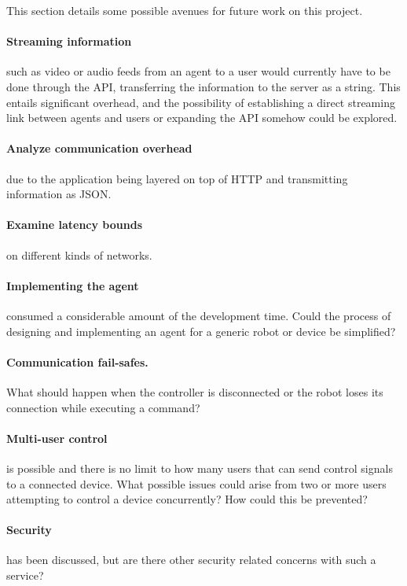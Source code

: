 This section details some possible avenues for future work on this project.

\paragraph{Streaming information} such as video or audio feeds from an agent to a user would currently have to be done through the API, transferring the information to the server as a string.
This entails significant overhead, and the possibility of establishing a direct streaming link between agents and users or expanding the API somehow could be explored.

\paragraph{Analyze communication overhead} due to the application being layered on top of HTTP and transmitting information as JSON.

\paragraph{Examine latency bounds} on different kinds of networks.

\paragraph{Implementing the agent} consumed a considerable amount of the development time.
Could the process of designing and implementing an agent for a generic robot or device be simplified?

\paragraph{Communication fail-safes.}
What should happen when the controller is disconnected or the robot loses its connection while executing a command?

\paragraph{Multi-user control} is possible and there is no limit to how many users that can send control signals to a connected device.
What possible issues could arise from two or more users attempting to control a device concurrently?
How could this be prevented?

\paragraph{Security} has been discussed, but are there other security related concerns with such a service?

